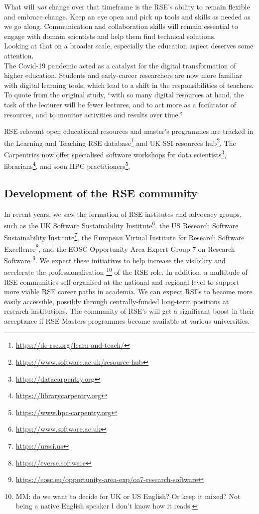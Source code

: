 \documentclass{eceasst}
\begin{document}
What will \emph{not} change over that timeframe is the RSE's ability to remain
flexible and embrace change. Keep an eye open and pick up tools and skills
as needed as we go along.
Communication and collaboration skills will remain essential to engage
with domain scientists and help them find technical solutions.\\

Looking at that on a broader scale, especially the education aspect deserves some attention.\\
The Covid-19 pandemic acted as a catalyst for the digital transformation
of higher education\cite{Bygstad2022}. Students and early-career researchers
are now more familiar with digital learning tools, which lead to a shift
in the responsibilities of teachers. To quote from the original study,
``with so many digital resources at hand,
the task of the lecturer will be fewer lectures,
and to act more as a facilitator of resources,
and to monitor activities and results over time.''\cite{Bygstad2022}

RSE-relevant open educational resources and master's programmes are tracked
in the Learning and Teaching RSE database\footnote{\url{https://de-rse.org/learn-and-teach/}}
and UK SSI resources hub\footnote{\url{https://www.software.ac.uk/resource-hub}}.
The Carpentries now offer specialised software workshops
for data scientists\footnote{\url{https://datacarpentry.org}},
librarians\footnote{\url{https://librarycarpentry.org}},
and soon HPC practitioners\footnote{\url{https://www.hpc-carpentry.org}}.

\subsection{Development of the RSE community}
In recent years, we saw the formation of RSE institutes and advocacy groups, such as
the UK Software Sustainability Institute\footnote{\url{https://www.software.ac.uk}},
the US Research Software Sustainability Institute\footnote{\url{https://urssi.us}},
the European Virtual Institute for Research Software Excellence\footnote{\url{https://everse.software}},
and the EOSC Opportunity Area Expert Group 7 on Research Software%
\footnote{\url{https://eosc.eu/opportunity-area-exp/oa7-research-software}}.
We expect these initiatives to help increase the visibility and accelerate
the professionalisation%
\footnote{MM: do we want to decide for UK or US English? Or keep it mixed? Not being a native English speaker I don't know how it reads.}
of the RSE role.
In addition, a multitude of RSE communities self-organised at the national
and regional level to support more viable RSE career paths in academia.
We can expect RSEs to become more easily accessible,
possibly through centrally-funded long-term positions at research institutions.
The community of RSE's will get a significant boost in their acceptance if RSE Masters programmes
become available at various universities.
\end{document}
